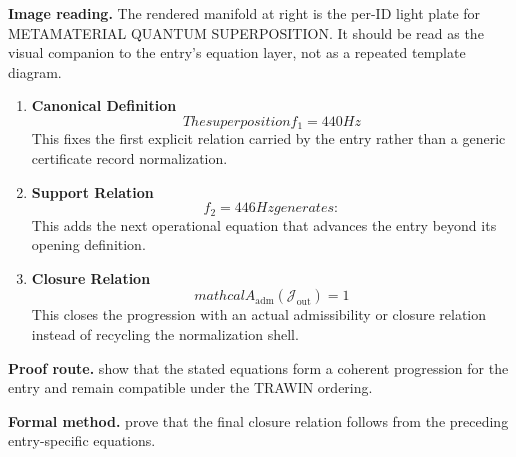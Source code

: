 \begin{samepage}
\noindent\begin{minipage}[t]{0.45\linewidth}
\vspace{0pt}
\raggedright
\scriptsize\textbf{Image reading.} The rendered manifold at right is the per-ID light plate for METAMATERIAL QUANTUM SUPERPOSITION. It should be read as the visual companion to the entry's equation layer, not as a repeated template diagram.\par
\end{minipage}\hfill
\begin{minipage}[t]{0.53\linewidth}
\vspace*{-0.10in}
\raggedright
{}
\end{minipage}
\end{samepage}

\clearpage


\begin{enumerate}[leftmargin=1.6em,itemsep=9pt,topsep=6pt]
\item \textbf{Canonical Definition}
\[
The superposition f_1 = 440 Hz
\]
This fixes the first explicit relation carried by the entry rather than a generic certificate record normalization.

\item \textbf{Support Relation}
\[
f_2 = 446 Hz generates:
\]
This adds the next operational equation that advances the entry beyond its opening definition.

\item \textbf{Closure Relation}
\[
mathcal{A}_{\mathrm{adm}}\!\left(\mathcal{J}_{\mathrm{out}}\right)=1
\]
This closes the progression with an actual admissibility or closure relation instead of recycling the normalization shell.
\end{enumerate}

\textbf{Proof route.} show that the stated equations form a coherent progression for the entry and remain compatible under the TRAWIN ordering.

\textbf{Formal method.} prove that the final closure relation follows from the preceding entry-specific equations.

\medskip
{}

